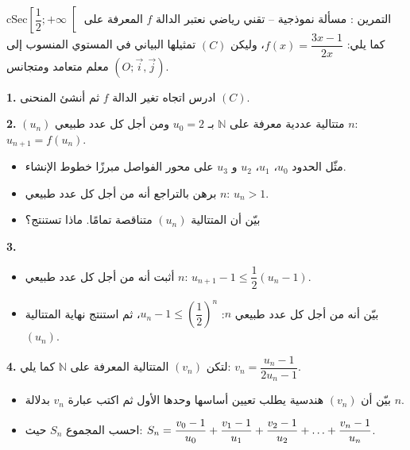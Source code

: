 \documentclass[12pt,a4paper]{article}
\newenvironment{BOX}[2]{\begin{otherlanguage}{english}\begin{arbox}{#1}{#2}}{\end{arbox}\end{otherlanguage}}
\newcounter{exo}
\newenvironment{tamrin}[1]{\stepcounter{exo}\begin{BOX}{cSec}{التمرين \theexo: #1}}{\end{BOX}}
\renewcommand{\dots}{\mathinner{\ldotp\ldotp\ldotp}}
\newcommand{\N}{\mathbb{N}}
\newenvironment{sq}{\begin{itemize}[leftmargin=2.4em,itemsep=3pt]}{\end{itemize}}
\newcommand{\qa}{\item[(أ)]}\newcommand{\qb}{\item[(ب)]}\newcommand{\qc}{\item[(جـ)]}\newcommand{\qd}{\item[(د)]}\newcommand{\qe}{\item[(هـ)]}
\newcommand{\QQ}[1]{\par\smallskip\textbf{#1.} }
\begin{document}
\begin{tamrin}{مسألة نموذجية -- تقني رياضي}
نعتبر الدالة $f$ المعرفة على $\left[\dfrac12;+\infty\right[$ كما يلي: $f(x)=\dfrac{3x-1}{2x}$، وليكن $(C)$ تمثيلها البياني في المستوي المنسوب إلى معلم متعامد ومتجانس $(O;\vec i,\vec j)$.

\QQ{1} ادرس اتجاه تغير الدالة $f$ ثم أنشئ المنحنى $(C)$.

\QQ{2} $(u_n)$ متتالية عددية معرفة على $\N$ بـ $u_0=2$ ومن أجل كل عدد طبيعي $n$: $u_{n+1}=f(u_n)$.
\begin{sq}
\qa مثّل الحدود $u_0$، $u_1$، $u_2$ و $u_3$ على محور الفواصل مبرزًا خطوط الإنشاء.
\qb برهن بالتراجع أنه من أجل كل عدد طبيعي $n$: $u_n>1$.
\qc بيّن أن المتتالية $(u_n)$ متناقصة تمامًا. ماذا تستنتج؟
\end{sq}
\QQ{3}
\begin{sq}
\qa أثبت أنه من أجل كل عدد طبيعي $n$: $u_{n+1}-1\le\dfrac12(u_n-1)$.
\qb بيّن أنه من أجل كل عدد طبيعي $n$: $u_n-1\le\left(\dfrac12\right)^n$، ثم استنتج نهاية المتتالية $(u_n)$.
\end{sq}
\QQ{4} لتكن $(v_n)$ المتتالية المعرفة على $\N$ كما يلي: $v_n=\dfrac{u_n-1}{2u_n-1}$.
\begin{sq}
\qa بيّن أن $(v_n)$ هندسية يطلب تعيين أساسها وحدها الأول ثم اكتب عبارة $v_n$ بدلالة $n$.
\qb احسب المجموع $S_n$ حيث: $S_n=\dfrac{v_0-1}{u_0}+\dfrac{v_1-1}{u_1}+\dfrac{v_2-1}{u_2}+\dots+\dfrac{v_n-1}{u_n}$.
\end{sq}
\end{tamrin}
\end{document}
